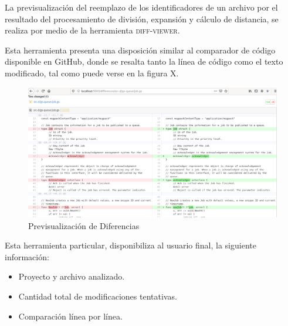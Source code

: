La previsualización del reemplazo de los identificadores de un archivo
por el resultado del procesamiento de división, expansión y cálculo de distancia,
se realiza por medio de la herramienta \textsc{diff-viewer}.

Esta herramienta presenta una disposición similar al comparador de código
disponible en GitHub, donde se resalta tanto la línea de código como el texto modificado,
tal como puede verse en la figura X.

\begin{figure}[H]
  \includegraphics[width=12cm]{implementation/diff_viewer.png}
  \centering
  \caption{Previsualización de Diferencias}
\end{figure}

Esta herramienta particular, disponibiliza al usuario final, la siguiente
información:

\begin{itemize}
  \item Proyecto y archivo analizado.
  \item Cantidad total de modificaciones tentativas.
  \item Comparación línea por línea.
\end{itemize}

